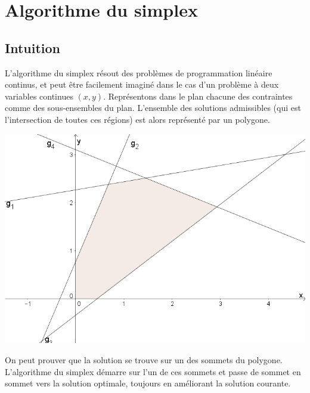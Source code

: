 \documentclass[a4paper]{report}
\begin{document}
\section{Algorithme du simplex}
\subsection{Intuition}
L'algorithme du simplex résout des problèmes de programmation linéaire continus, et peut être facilement imaginé dans le cas d'un problème à deux variables continues \((x,y)\). Représentons dans le plan chacune des contraintes comme des sous-ensembles du plan. L'ensemble des solutions admissibles (qui est l'intersection de toutes ces régions) est alors représenté par un polygone.
\begin{center}\textbf{\textbf{}}
\includegraphics{simplex-xy.png}
\end{center}
On peut prouver que la solution se trouve sur un des sommets du polygone. L'algorithme du simplex démarre sur l'un de ces sommets et passe de sommet en sommet vers la solution optimale, toujours en améliorant la solution courante.
\end{document}
